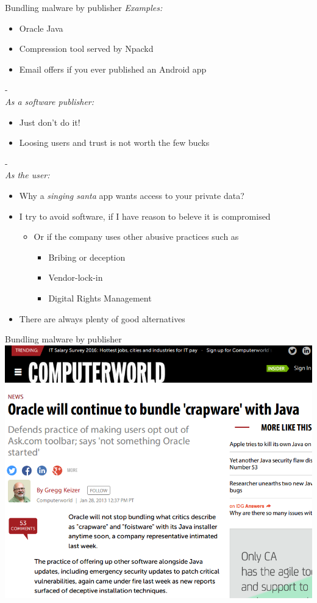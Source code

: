 \documentclass[11pt]{beamer}
\begin{document}
\begin{frame}{Bundling malware by publisher}
\emph{Examples:}
\begin{itemize}
\item Oracle Java
\item Compression tool served by Npackd %
\item Email offers if you ever published an Android app
\end{itemize}
-\\
\pause
\emph{As a software publisher:}
\begin{itemize}
\item Just don't do it!
\item Loosing users and trust is not worth the few bucks
\end{itemize}
-\\
\pause
\emph{As the user:}
\begin{itemize}
\item Why a \emph{singing santa} app wants access to your private data?
\item I try to avoid software, if I have reason to beleve it is compromised %
\begin{itemize}
\item Or if the company uses other abusive practices such as
\begin{itemize}
\item Bribing or deception
\item Vendor-lock-in
\item Digital Rights Management
\end{itemize}
\end{itemize}
\item There are always plenty of good alternatives
\end{itemize}
\end{frame}

\begin{frame}{Bundling malware by publisher}
\includegraphics[scale=0.3]{oracle.png}
\end{frame}
\end{document}
